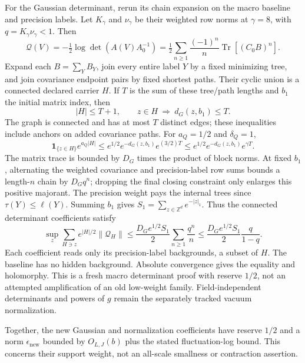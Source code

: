 For the Gaussian determinant, rerun its chain expansion on
the macro baseline and precision labels. Let $K_\gamma$
and $\nu_\gamma$ be their weighted row norms at $\gamma=8$,
with $q=K_\gamma\nu_\gamma<1$. Then
\begin{equation}\label{ag-det-series}
 \mathcal Q(V)=-\tfrac12\log\det(A(V)A_0^{-1})
   =\tfrac12\sum_{n\ge1}\frac{(-1)^n}{n}
                        \operatorname{Tr}[(C_0B)^n].
\end{equation}
Expand each $B=\sum_YB_Y$, join every entire label $Y$ by
a fixed minimizing tree, and join covariance endpoint pairs
by fixed shortest paths. Their cyclic union is a connected
declared carrier $H$. If $T$ is the sum of these tree/path
lengths and $b_1$ the initial matrix index, then
\begin{equation}\label{ag-det-geometry}
 |H|\le T+1,\qquad z\in H\ \Longrightarrow\ d_G(z,b_1)\le T.
\end{equation}
The graph is connected and has at most $T$ distinct edges;
these inequalities include anchors on added covariance paths.
For $a_Q=1/2$ and $\delta_Q=1$,
\[
 \mathbf1_{\{z\in H\}}e^{a_Q|H|}
 \le e^{1/2}e^{-d_G(z,b_1)}e^{(3/2)T}
 \le e^{1/2}e^{-d_G(z,b_1)}e^{\gamma T}.
\]
The matrix trace is bounded by $D_G$ times the product of
block norms. At fixed $b_1$, alternating the weighted
covariance and precision-label row sums bounds a length-$n$
chain by $D_Gq^n$; dropping the final closing constraint
only enlarges this positive majorant. The precision weight
pays the internal trees since $\tau(Y)\le\ell(Y)$.
Summing $b_1$ gives $S_1=\sum_{z\in\mathbb Z^d}e^{-|z|_1}$.
Thus the connected determinant coefficients satisfy
\begin{equation}\label{ag-det-bound}
 \sup_z\sum_{H\ni z}e^{|H|/2}\|\mathcal Q_H\|
 \le\frac{D_Ge^{1/2}S_1}{2}\sum_{n\ge1}\frac{q^n}{n}
 \le\frac{D_Ge^{1/2}S_1}{2}\frac q{1-q}.
\end{equation}
Each coefficient reads only its precision-label backgrounds,
a subset of $H$. The baseline has no hidden background.
Absolute convergence gives the equality and holomorphy.
This is a fresh macro determinant proof with reserve $1/2$,
not an attempted amplification of an old low-weight family.
Field-independent determinants and powers of $g$ remain
the separately tracked vacuum normalization.

Together, the new Gaussian and normalization coefficients
have reserve $1/2$ and a norm $\epsilon_{\mathrm{new}}$
bounded by $O_{L,J}(b)$ plus the stated fluctuation-log bound.
This concerns their support weight, not an all-scale
smallness or contraction assertion.

